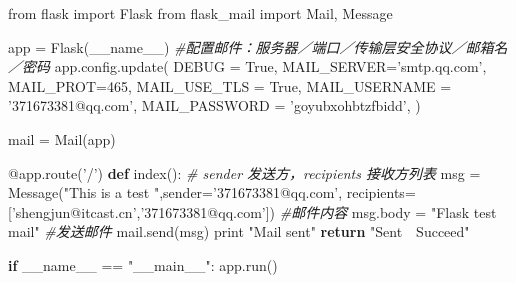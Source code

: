 \documentclass[11pt]{article}
\newenvironment{Shaded}{}{}
\newcommand{\KeywordTok}[1]{\textcolor[rgb]{0.00,0.44,0.13}{\textbf{{#1}}}}
\newcommand{\DecValTok}[1]{\textcolor[rgb]{0.25,0.63,0.44}{{#1}}}
\newcommand{\StringTok}[1]{\textcolor[rgb]{0.25,0.44,0.63}{{#1}}}
\newcommand{\CommentTok}[1]{\textcolor[rgb]{0.38,0.63,0.69}{\textit{{#1}}}}
\newcommand{\NormalTok}[1]{{#1}}
\newcommand{\ImportTok}[1]{{#1}}
\newcommand{\VariableTok}[1]{\textcolor[rgb]{0.10,0.09,0.49}{{#1}}}
\newcommand{\ControlFlowTok}[1]{\textcolor[rgb]{0.00,0.44,0.13}{\textbf{{#1}}}}
\newcommand{\OperatorTok}[1]{\textcolor[rgb]{0.40,0.40,0.40}{{#1}}}
\newcommand{\BuiltInTok}[1]{{#1}}
\newcommand{\AttributeTok}[1]{\textcolor[rgb]{0.49,0.56,0.16}{{#1}}}
\begin{document}
\begin{Shaded}
\begin{Highlighting}[]
\ImportTok{from}\NormalTok{ flask }\ImportTok{import}\NormalTok{ Flask}
\ImportTok{from}\NormalTok{ flask_mail }\ImportTok{import}\NormalTok{ Mail, Message}

\NormalTok{app }\OperatorTok{=}\NormalTok{ Flask(}\VariableTok{__name__}\NormalTok{)}
\CommentTok{#配置邮件：服务器／端口／传输层安全协议／邮箱名／密码}
\NormalTok{app.config.update(}
\NormalTok{    DEBUG }\OperatorTok{=} \VariableTok{True}\NormalTok{,}
\NormalTok{    MAIL_SERVER}\OperatorTok{=}\StringTok{'smtp.qq.com'}\NormalTok{,}
\NormalTok{    MAIL_PROT}\OperatorTok{=}\DecValTok{465}\NormalTok{,}
\NormalTok{    MAIL_USE_TLS }\OperatorTok{=} \VariableTok{True}\NormalTok{,}
\NormalTok{    MAIL_USERNAME }\OperatorTok{=} \StringTok{'371673381@qq.com'}\NormalTok{,}
\NormalTok{    MAIL_PASSWORD }\OperatorTok{=} \StringTok{'goyubxohbtzfbidd'}\NormalTok{,}
\NormalTok{)}

\NormalTok{mail }\OperatorTok{=}\NormalTok{ Mail(app)}

\AttributeTok{@app.route}\NormalTok{(}\StringTok{'/'}\NormalTok{)}
\KeywordTok{def}\NormalTok{ index():}
 \CommentTok{# sender 发送方，recipients 接收方列表}
\NormalTok{    msg }\OperatorTok{=}\NormalTok{ Message(}\StringTok{"This is a test "}\NormalTok{,sender}\OperatorTok{=}\StringTok{'371673381@qq.com'}\NormalTok{, recipients}\OperatorTok{=}\NormalTok{[}\StringTok{'shengjun@itcast.cn'}\NormalTok{,}\StringTok{'371673381@qq.com'}\NormalTok{])}
    \CommentTok{#邮件内容}
\NormalTok{    msg.body }\OperatorTok{=} \StringTok{"Flask test mail"}
    \CommentTok{#发送邮件}
\NormalTok{    mail.send(msg)}
    \BuiltInTok{print} \StringTok{"Mail sent"}
    \ControlFlowTok{return} \StringTok{"Sent　Succeed"}

\ControlFlowTok{if} \VariableTok{__name__} \OperatorTok{==} \StringTok{"__main__"}\NormalTok{:}
\NormalTok{    app.run()}
\end{Highlighting}
\end{Shaded}


    
    
    
    
\end{document}
